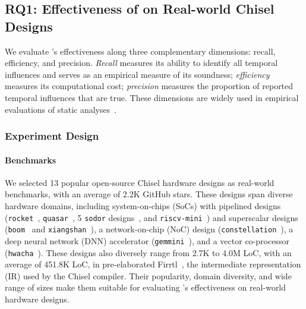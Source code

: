 \subsection{RQ1: Effectiveness of \tia on Real-world Chisel Designs}\label{sec:eval-tia}

We evaluate \tia's effectiveness along three complementary dimensions: recall, efficiency, and precision.
\emph{Recall} measures its ability to identify all temporal influences and serves as an empirical measure of its soundness;
\emph{efficiency} measures its computational cost;
\emph{precision} measures the proportion of reported temporal influences that are true.
These dimensions are widely used in empirical evaluations of static analyses~\cite{park_survey_2022,delaitre_sate_2018}.

\subsubsection{Experiment Design}\label{sec:exp-tia}

\paragraph{Benchmarks}
We selected 13 popular open-source Chisel hardware designs as real-world benchmarks, with an average of 2.2K GitHub stars.
These designs span diverse hardware domains, including system-on-chips (SoCs) with pipelined designs (\texttt{rocket}~\cite{asanovic_rocket_2016}, \texttt{quasar}~\cite{quasar}, 5 \texttt{sodor} designs~\cite{sodor}, and \texttt{riscv-mini}~\cite{riscvmini}) and superscalar designs (\texttt{boom}~\cite{celio_berkeley_2015} and \texttt{xiangshan}~\cite{xu_towards_2022}), a network-on-chip (NoC) design (\texttt{constellation}~\cite{zhao_constellation_2022}), a deep neural network (DNN) accelerator (\texttt{gemmini}~\cite{genc_gemmini_2021}), and a vector co-processor (\texttt{hwacha}~\cite{lee_hwacha_2015}).
These designs also diversely range from 2.7K to 4.0M LoC, with an average of 451.8K LoC, in pre-elaborated Firrtl~\cite{izraelevitz_reusability_2017}, the intermediate representation (IR) used by the Chisel compiler.
Their popularity, domain diversity, and wide range of sizes make them suitable for evaluating \tia's effectiveness on real-world hardware designs.

